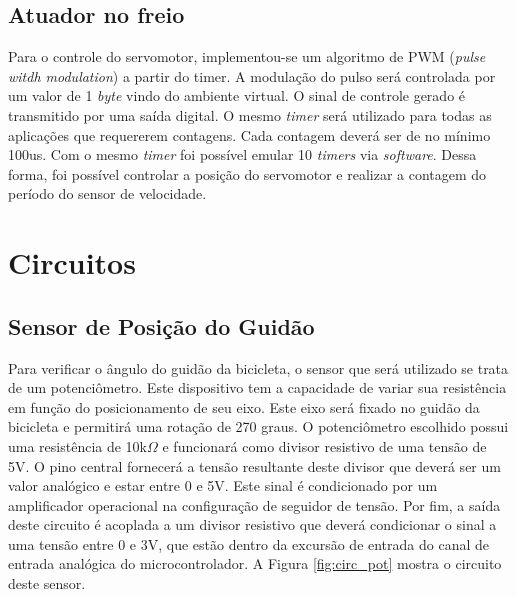 \subsection{Atuador no freio} %
\label{sub:read_freio_sens}

Para o controle do servomotor, implementou-se um algoritmo de PWM (\textit{pulse witdh modulation}) a partir do timer. A modulação do pulso será controlada por um valor de 1 \textit{byte} vindo do ambiente virtual. O sinal de controle gerado é transmitido por uma saída digital. O mesmo \textit{timer} será utilizado para todas as aplicações que requererem contagens. Cada contagem deverá ser de no mínimo 100us. Com o mesmo \textit{timer} foi possível emular 10 \textit{timers} via \textit{software}. Dessa forma, foi possível controlar a posição do servomotor e realizar a contagem do período do sensor de velocidade.

\section{Circuitos} %
\label{sec:circuito}

\subsection{Sensor de Posição do Guidão} %
\label{sub:poteciometro_guidao}

Para verificar o ângulo do guidão da bicicleta, o sensor que será utilizado se trata de um potenciômetro. Este dispositivo tem a capacidade de variar sua resistência em função do posicionamento de seu eixo. Este eixo será fixado no guidão da bicicleta e permitirá uma rotação de 270 graus. O potenciômetro escolhido possui uma resistência de 10k$\Omega$ e funcionará como divisor resistivo de uma tensão de 5V. O pino central fornecerá a tensão resultante deste divisor que deverá ser um valor analógico e estar entre 0 e 5V. Este sinal é condicionado por um amplificador operacional na configuração de seguidor de tensão. Por fim, a saída deste circuito é acoplada a um divisor resistivo que deverá condicionar o sinal a uma tensão entre 0 e 3V, que estão dentro da excursão de entrada do canal de entrada analógica do microcontrolador. A Figura \ref{fig:circ_pot} mostra o circuito deste sensor.

